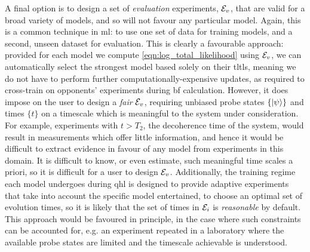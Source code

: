 A final option is to design a set of \emph{evaluation} experiments, ${ \mathcal{E} }_v$, 
    that are valid for a broad variety of models, and so will not favour any particular model.
Again, this is a common technique in \gls{ml}: to use one set of data for training models, 
    and a second, unseen dataset for evaluation. 
This is clearly a favourable approach: 
    provided for each model we compute \cref{eqn:log_total_likelihood} using ${ \mathcal{E} }_v$,
    we can automatically select the strongest model based solely on their \glspl{tltl}, 
    meaning we do not have to perform further computationally-expensive updates, 
    as required to cross-train on opponents' 
    experiments during \gls{bf} calculation. 
However, it does impose on the user to design a \emph{fair} ${ \mathcal{E} }_v$, 
    requiring unbiased \gls{probe} states $\{\ket{\psi}\}$ and times $\{t\}$ on a timescale 
    which is meaningful to the system under consideration. 
For example, experiments with $t > T_2$, the decoherence time of the system, 
    would result in measurements which offer little information, 
    and hence it would be difficult to extract evidence in favour of any 
    model from experiments in this domain.
It is difficult to know, or even estimate, such meaningful time scales a priori,
    so it is difficult for a user to design ${ \mathcal{E} }_v$. 
Additionally, the training regime each model undergoes during \gls{qhl}
    is designed to provide adaptive experiments that take into account
    the specific model entertained, to choose an optimal set of evolution times, 
    so it is likely that the set of times in ${ \mathcal{E} }_i$ is \emph{reasonable} by default. 
This approach would be favoured in principle, in the case where such constraints can be accounted for,
    e.g. an experiment repeated in a laboratory where the available 
    \gls{probe} states are limited and the timescale achievable is understood. 
     
